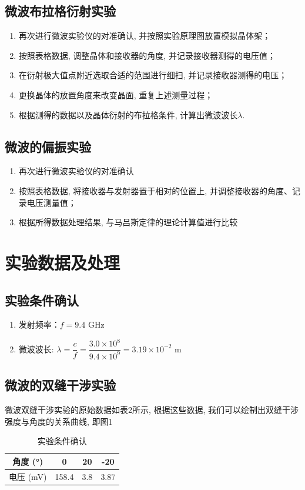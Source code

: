 \documentclass[zihao=5, UTF8]{article}
\theoremstyle{MyLineTheoremStyle} %
\theoremstyle{MyBlockTheoremStyle} %
\theoremstyle{MySubsubsectionStyle} %
\begin{document}
\subsection{微波布拉格衍射实验}
\begin{enumerate}
    \item 再次进行微波实验仪的对准确认, 并按照实验原理图放置模拟晶体架； 
    \item 按照表格数据, 调整晶体和接收器的角度, 并记录接收器测得的电压值； 
    \item 在衍射极大值点附近选取合适的范围进行细扫, 并记录接收器测得的电压； 
    \item 更换晶体的放置角度来改变晶面, 重复上述测量过程； 
    \item 根据测得的数据以及晶体衍射的布拉格条件, 计算出微波波长$\lambda$. 
\end{enumerate}
\subsection{微波的偏振实验}
\begin{enumerate}
    \item 再次进行微波实验仪的对准确认
    \item 按照表格数据, 将接收器与发射器置于相对的位置上, 并调整接收器的角度、记录电压测量值； 
    \item 根据所得数据处理结果, 与马吕斯定律的理论计算值进行比较
\end{enumerate}
\section{实验数据及处理}
\subsection{实验条件确认}
\begin{enumerate}
    \item 发射频率：$f = 9.4$ GHz
    \item 微波波长: $\lambda = \dfrac{c}{f} = \dfrac{3.0 \times 10^8}{9.4 \times 10^9} = 3.19 \times 10^{-2}$ m
\end{enumerate}
\subsection{微波的双缝干涉实验}
微波双缝干涉实验的原始数据如表2所示, 根据这些数据, 我们可以绘制出双缝干涉强度与角度的关系曲线, 即图1
\begin{table}[H]
    \centering
    \begin{tabular}{|c|c|c|c|}
        \hline
        角度 (°) & 0 & 20 & -20 \\
        \hline
        电压 (mV) & 158.4 & 3.8 & 3.87 \\
        \hline
    \end{tabular}
    \caption{实验条件确认}
\end{table}
\end{document}
